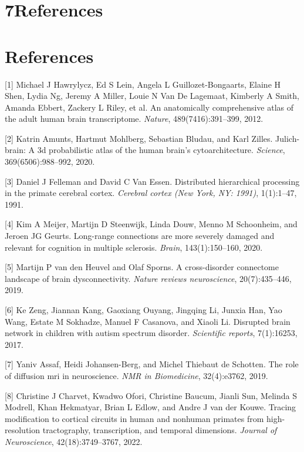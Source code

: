 \documentclass{article}
\begin{document}
\section*{7\quad References}

\section*{References}

\begin{hangpars}\small\setlength{\parindent}{0pt}
[1] Michael J Hawrylycz, Ed S Lein, Angela L Guillozet-Bongaarts, Elaine H Shen, Lydia Ng, Jeremy A Miller, Louie N Van De Lagemaat, Kimberly A Smith, Amanda Ebbert, Zackery L Riley, et al. An anatomically comprehensive atlas of the adult human brain transcriptome. \emph{Nature}, 489(7416):391–399, 2012.

[2] Katrin Amunts, Hartmut Mohlberg, Sebastian Bludau, and Karl Zilles. Julich-brain: A 3d probabilistic atlas of the human brain’s cytoarchitecture. \emph{Science}, 369(6506):988–992, 2020.

[3] Daniel J Felleman and David C Van Essen. Distributed hierarchical processing in the primate cerebral cortex. \emph{Cerebral cortex (New York, NY: 1991)}, 1(1):1–47, 1991.

[4] Kim A Meijer, Martijn D Steenwijk, Linda Douw, Menno M Schoonheim, and Jeroen JG Geurts. Long-range connections are more severely damaged and relevant for cognition in multiple sclerosis. \emph{Brain}, 143(1):150–160, 2020.

[5] Martijn P van den Heuvel and Olaf Sporns. A cross-disorder connectome landscape of brain dysconnectivity. \emph{Nature reviews neuroscience}, 20(7):435–446, 2019.

[6] Ke Zeng, Jiannan Kang, Gaoxiang Ouyang, Jingqing Li, Junxia Han, Yao Wang, Estate M Sokhadze, Manuel F Casanova, and Xiaoli Li. Disrupted brain network in children with autism spectrum disorder. \emph{Scientific reports}, 7(1):16253, 2017.

[7] Yaniv Assaf, Heidi Johansen-Berg, and Michel Thiebaut de Schotten. The role of diffusion mri in neuroscience. \emph{NMR in Biomedicine}, 32(4):e3762, 2019.

[8] Christine J Charvet, Kwadwo Ofori, Christine Baucum, Jianli Sun, Melinda S Modrell, Khan Hekmatyar, Brian L Edlow, and Andre J van der Kouwe. Tracing modification to cortical circuits in human and nonhuman primates from high-resolution tractography, transcription, and temporal dimensions. \emph{Journal of Neuroscience}, 42(18):3749–3767, 2022.


\end{hangpars}
\end{document}
